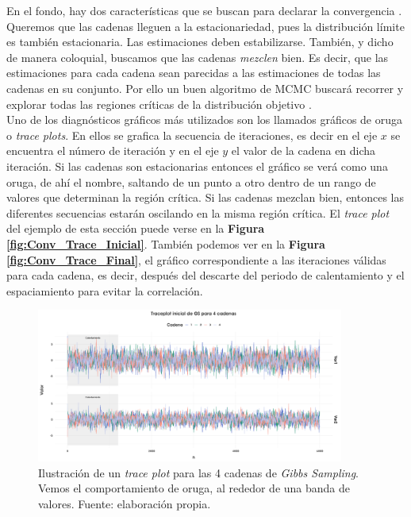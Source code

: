 En el fondo, hay dos características que se buscan para declarar la convergencia \parencite{Gelman13}. Queremos que las cadenas lleguen a la estacionariedad, pues la distribución límite es también estacionaria. Las estimaciones deben estabilizarse. También, y dicho de manera coloquial, buscamos que las cadenas \textit{mezclen} bien. Es decir, que las estimaciones para cada cadena sean parecidas a las estimaciones de todas las cadenas en su conjunto. Por ello un buen algoritmo de MCMC buscará recorrer y explorar todas las regiones críticas de la distribución objetivo \parencites{Neal93,Betancourt18}.\\ 

Uno de los diagnósticos gráficos más utilizados son los llamados gráficos de oruga o \textit{trace plots}. En ellos se grafica la secuencia de iteraciones, es decir en el eje $x$ se encuentra el número de iteración y en el eje $y$ el valor de la cadena en dicha iteración. Si las cadenas son estacionarias entonces el gráfico se verá como una oruga, de ahí el nombre, saltando de un punto a otro dentro de un rango de valores que determinan la región crítica. Si las cadenas mezclan bien, entonces las diferentes secuencias estarán oscilando en la misma región crítica. El \textit{trace plot} del ejemplo de esta sección puede verse en la \textbf{Figura \ref{fig:Conv_Trace_Inicial}}. También podemos ver en la \textbf{Figura \ref{fig:Conv_Trace_Final}}, el gráfico correspondiente a las iteraciones válidas para cada cadena, es decir, después del descarte del periodo de calentamiento y el espaciamiento para evitar la correlación.\\

\begin{figure}[h]
	\centering
	\includegraphics[width=0.9\textwidth]{Figs/Bayes/Ejemplos_Convergencia_Traceplot_Inicial}
	\caption{Ilustración de un \textit{trace plot} para las 4 cadenas de \textit{Gibbs Sampling}. Vemos el comportamiento de oruga, al rededor de una banda de valores. Fuente: elaboración propia.}
	\label{fig:Conv_Prom_Erg}	
\end{figure}

